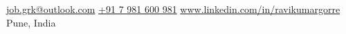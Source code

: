 \documentclass[10pt,a4paper]{article}
\begin{document}
\sloppy  %



\nobreakvspace{0.3em}  %

\noindent\href{mailto:job.grk@outlook.com}{job.grk@outlook.com}\sbull
\href{tel:+917981600981}{+91 7 981 600 981}\sbull
\href{http://www.linkedin.com/in/ravikumargorre}{www.linkedin.com/in/ravikumargorre}
\\
Pune, India

\spacedhrule{0.9em}{-0.4em}  %



\begin{flushleft}
    
\end{flushleft}
\spacedhrule{-0.1em}{-0.4em}

\vspace{-1.25em}
\begin{multicols}{3}
    \begin{flushleft}
        
    \end{flushleft}
\end{multicols}
\spacedhrule{-0.1em}{-0.4em}


\end{document}
